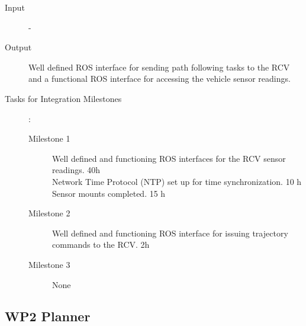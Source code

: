 \documentclass[11pt,a4paper]{article}
\begin{document}
\begin{description}
\item[Input] -
\item[Output] Well defined ROS interface for sending path following tasks to the RCV and a functional ROS interface for accessing the vehicle sensor readings.
\item[Tasks for Integration Milestones]:\
	\begin{description}
		\item[Milestone 1] Well defined and functioning ROS interfaces for the RCV sensor readings. 40h\\
  Network Time Protocol (NTP) set up for time synchronization. 10 h\\
  Sensor mounts completed. 15 h 
		\item[Milestone 2] Well defined and functioning ROS interface for issuing trajectory commands to the RCV. 2h
		\item[Milestone 3] None
	\end{description}	 
\end{description}

\subsection{WP2 Planner}
\end{document}
